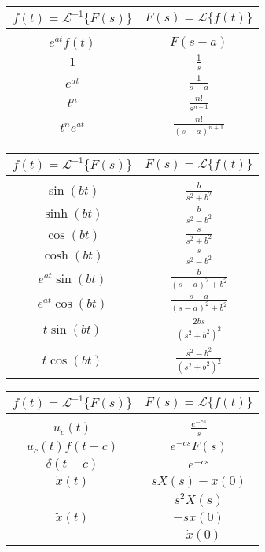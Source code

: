 \begin{paracol}{3}

\begin{center}
\begin{tabular}{c|c}
    $f(t) = \mathcal{L}^{-1}\{F(s)\}$ & $F(s) = \mathcal{L}\{f(t)\}$ \\[0.25cm]
    \hline \\
    $e^{at} f(t)$ & $F(s-a)$ \\[0.5cm]
    $1$ & $\frac{1}{s}$ \\[0.5cm]
    $e^{at}$ & $\frac{1}{s-a}$ \\[0.5cm]
    $t^n$ & $\frac{n!}{s^{n+1}}$ \\[0.5cm]
    $t^n e^{at}$ & $\frac{n!}{(s-a)^{n+1}}$
\end{tabular}
\end{center}

\switchcolumn

\begin{center}
\begin{tabular}{c|c}
    $f(t) = \mathcal{L}^{-1}\{F(s)\}$ & $F(s) = \mathcal{L}\{f(t)\}$ \\[0.25cm]
    \hline \\
    $\sin(bt)$ & $\frac{b}{s^2 + b^2}$ \\[0.25cm]
    $\sinh(bt)$ & $\frac{b}{s^2 - b^2}$ \\[0.25cm]
    $\cos(bt)$ & $\frac{s}{s^2 + b^2}$ \\[0.25cm]
    $\cosh(bt)$ & $\frac{s}{s^2 - b^2}$ \\[0.25cm]
    $e^{at} \sin(bt)$ & $\frac{b}{(s-a)^2 + b^2}$ \\[0.25cm]
    $e^{at} \cos(bt)$ & $\frac{s-a}{(s-a)^2 + b^2}$ \\[0.25cm]
    $t \sin(bt)$ & $\frac{2bs}{(s^2 + b^2)^2}$ \\[0.25cm]
    $t \cos(bt)$ & $\frac{s^2 - b^2}{(s^2 + b^2)^2}$
\end{tabular}
\end{center}

\switchcolumn

\begin{center}
\begin{tabular}{c|c}
    $f(t) = \mathcal{L}^{-1}\{F(s)\}$ & $F(s) = \mathcal{L}\{f(t)\}$ \\[0.25cm]
    \hline \\
    $u_c(t)$ & $\frac{e^{-cs}}{s}$ \\[0.5cm]
    $u_c(t) f(t-c)$ & $e^{-cs} F(s)$ \\[0.5cm]
    $\delta(t-c)$ & $e^{-cs}$ \\[0.5cm]
    $\dot{x}(t)$ & $sX(s) - x(0)$ \\[0.5cm]
     & $s^2 X(s)$ \\
    $\ddot{x}(t)$ & $- s x(0)$ \\
     & $- \dot{x}(0)$
\end{tabular}
\end{center}

\end{paracol}

